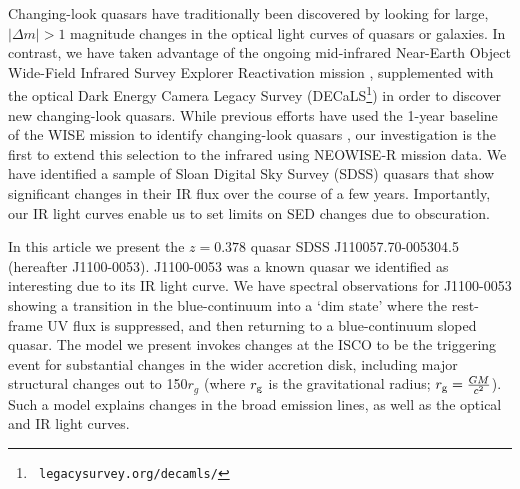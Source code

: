 \documentclass{nature}
\begin{document}
Changing-look quasars have traditionally been discovered by looking
for large, $| \Delta m | >1$ magnitude changes in the optical light
curves of quasars or galaxies. In contrast, we have taken advantage of
the ongoing mid-infrared Near-Earth Object Wide-Field Infrared Survey
Explorer Reactivation mission \cite[NEOWISE-R; ][]{Mainzer2014,
Meisner2017a, Meisner2017b}, supplemented with the optical Dark Energy
Camera Legacy Survey (DECaLS\footnote{{\tt
legacysurvey.org/decamls/}}) in order to discover new changing-look
quasars.  While previous efforts have used the 1-year baseline of the
WISE mission to identify changing-look quasars
\cite[e.g.,][]{Assef2017}, our investigation is the first to extend
this selection to the infrared using NEOWISE-R mission data. We have
identified a sample of Sloan Digital Sky Survey (SDSS) quasars that
show significant changes in their IR flux over the course of a few
years. Importantly, our IR light curves enable us to set limits on SED
changes due to obscuration.

In this article we present the $z=0.378$ quasar SDSS
J110057.70-005304.5 (hereafter J1100-0053).  J1100-0053 was a known
quasar we identified as interesting due to its IR light curve. We have
spectral observations for J1100-0053 showing a transition in the
blue-continuum into a `dim state' where the rest-frame UV flux is
suppressed, and then returning to a blue-continuum sloped quasar.  The
model we present invokes changes at the ISCO to be the triggering
event for substantial changes in the wider accretion disk, including
major structural changes out to 150$r_{g}$ (where $r_{\rm g}$ is the
gravitational radius; $r_{\rm g}=\frac{GM}{c^2}$).  Such a model
explains changes in the broad emission lines, as well as the optical
and IR light curves. 
\end{document}
